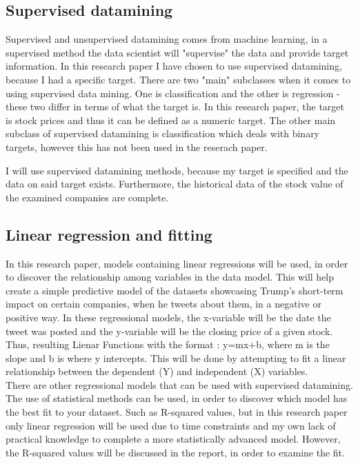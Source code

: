 \documentclass[11pt]{article}
\begin{document}
\subsection{Supervised datamining}
Supervised and unsupervised datamining comes from machine learning, in a supervised method the data scientist will "supervise" the data and provide target information. In this research paper I have chosen to use supervised datamining, because I had a specific target.  There are two "main" subclasses when it comes to using supervised data mining. One is classification and the other is regression - these two differ in terms of what the target is. In this research paper, the target is stock prices and thus it can be defined as a numeric target. The other main subclass of supervised datamining is classification which deals with binary targets, however this has not been used in the reserach paper.

I will use supervised datamining methods, because my target is specified and the data on said target exists. Furthermore, the historical data of the stock value of the examined companies are complete.



\subsection{Linear regression and fitting}
In this research paper, models containing linear regressions will be used, in order to discover the relationship among variables in the data model.  This will help create a simple predictive model of the datasets showcasing Trump's short-term impact on certain companies, when he tweets about them, in a negative or positive way. In these regressional models, the x-variable will be the date the tweet was posted and the y-variable will be the closing price of a given stock. Thus, resulting Lienar  Functions with the format : y=mx+b, where m is the slope and b is where y intercepts. This will be done by attempting to fit a linear relationship between the dependent (Y) and independent (X) variables. \\

There are other regressional models that can be used with supervised datamining. The use of statistical methods can be used, in order to discover which model has the best fit to your dataset. Such as  R-squared values, but in this research paper only linear regression will be used due to time constraints and my own lack of practical knowledge to complete a more statistically advanced model. However, the R-squared values will be discussed in the report, in order to examine the fit. \\
\end{document}
